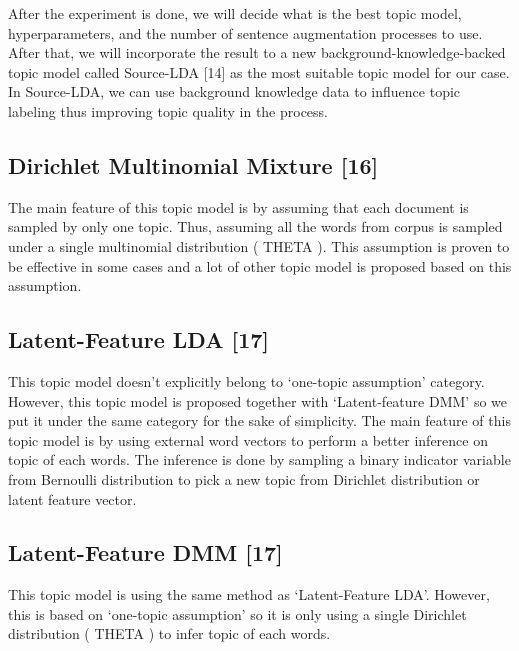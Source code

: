 \documentclass[senior]{IPSstyle}
\begin{document}
After the experiment is done, we will decide what is the best topic model, hyperparameters, and the number of sentence augmentation processes to use. After that, we will incorporate the result to a new background-knowledge-backed topic model called Source-LDA [14] as the most suitable topic model for our case. In Source-LDA, we can use background knowledge data to influence topic labeling thus improving topic
quality in the process.

\subsection{Dirichlet Multinomial Mixture [16]}

The main feature of this topic model is by assuming that each document is sampled by only one topic. Thus, assuming all the words from corpus is sampled under a single multinomial distribution ( THETA ). This assumption is proven to be effective in some cases and a lot of other topic model is proposed based on this assumption.

\subsection{Latent-Feature LDA [17]}

This topic model doesn’t explicitly belong to ‘one-topic assumption’ category. However, this topic model is proposed together with ‘Latent-feature DMM’ so we put it under the same category for the sake of simplicity. The main feature of this topic model is by using external word vectors to perform a better inference on topic of each words. The inference is done by sampling a binary indicator variable from Bernoulli distribution to pick a new topic from Dirichlet distribution or latent feature vector.

\subsection{Latent-Feature DMM [17]}

This topic model is using the same method as ‘Latent-Feature LDA’. However, this is based on ‘one-topic assumption’ so it is only using a single Dirichlet distribution ( THETA ) to
infer topic of each words.
\end{document}

